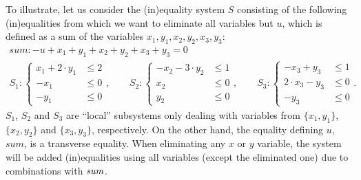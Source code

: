 \begin{example}\label{ex:1}
To illustrate, let us consider the (in)equality system $S$ consisting of the following (in)equalities from which we want to eliminate all variables but $u$, %
which is defined as a sum %
of the variables $x_1, y_1, x_2, y_2, x_3, y_3$:
\begin{gather*}
\mathit{sum}: -u + x_1 + y_1 + x_2 + y_2 + x_3 + y_3= 0\\
S_1: \left\{ \begin{array}{ll}x_1 + 2 \cdot y_1 &\leq 2\\
															 -x_1 &\leq 0\\
															 -y_1 &\leq 0\end{array}\right.,\qquad
S_2 : \left\{ \begin{array}{ll} -x_2 - 3\cdot y_2 &\leq 1\\
																 x_2 &\leq 0\\
																 y_2 &\leq 0\end{array}\right.,\qquad
S_3 : \left\{ \begin{array}{ll} -x_3 + y_3 &\leq 1\\
																 2\cdot x_3 - y_3 &\leq 0\\
																 -y_3 &\leq 0\end{array}\right..
\end{gather*}
$S_1$, $S_2$ and $S_3$ are ``local'' subsystems only dealing with variables from $\{x_1,y_1\}$, $\{x_2, y_2\}$ and $\{x_3,y_3\}$, respectively. On the other hand, the equality defining $u$, %
$\mathit{sum}$, %
is a transverse equality. When eliminating any $x$ or $y$ variable, the system will be added (in)equalities using all variables (except the eliminated one) due to combinations with $\mathit{sum}$. %
\end{example}

